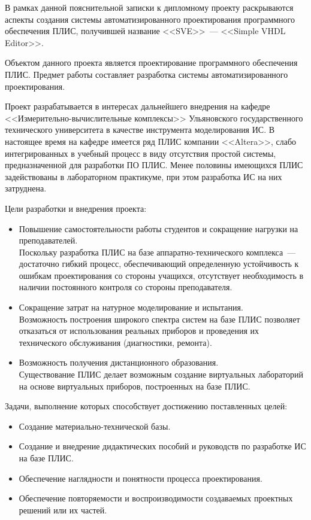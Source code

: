 В рамках данной пояснительной записки к дипломному проекту раскрываются аспекты создания системы автоматизированного проектирования программного обеспечения ПЛИС, получившей название <<SVE>>~--- <<Simple VHDL Editor>>.

Объектом данного проекта является проектирование программного обеспечения ПЛИС. Предмет работы составляет разработка системы автоматизированного проектирования.

Проект разрабатывается в интересах дальнейшего внедрения на кафедре <<Измерительно-вычислительные комплексы>> Ульяновского государственного технического университета в качестве инструмента моделирования ИС.
В настоящее время на кафедре имеется ряд ПЛИС компании <<Altera>>, слабо интегрированных в учебный процесс в виду отсутствия простой системы, предназначенной для разработки ПО ПЛИС.
Менее половины имеющихся ПЛИС задействованы в лабораторном практикуме, при этом разработка ИС на них затруднена.

Цели разработки и внедрения проекта:
\begin{itemize}
  \item Повышение самостоятельности работы студентов и сокращение нагрузки на преподавателей.\\
  Поскольку разработка ПЛИС на базе аппаратно-технического комплекса~--- достаточно гибкий процесс, обеспечивающий определенную устойчивость к ошибкам проектирования со стороны учащихся, отсутствует необходимость в наличии постоянного контроля со стороны преподавателя.
  \item Сокращение затрат на натурное моделирование и испытания.\\
  Возможность построения широкого спектра систем на базе ПЛИС позволяет отказаться от использования реальных приборов и проведения их технического обслуживания (диагностики, ремонта).
  \item Возможность получения дистанционного образования.\\
  Существование ПЛИС делает возможным создание виртуальных лабораторий на основе виртуальных приборов,  построенных на базе ПЛИС.
\end{itemize}

Задачи, выполнение которых способствует достижению поставленных целей:
\begin{itemize}
  \item Создание материально-технической базы.
  \item Создание и внедрение дидактических пособий и руководств по разработке ИС на базе ПЛИС.
  \item Обеспечение наглядности и понятности процесса проектирования.
  \item Обеспечение повторяемости и воспроизводимости создаваемых проектных решений или их частей.
\end{itemize}

